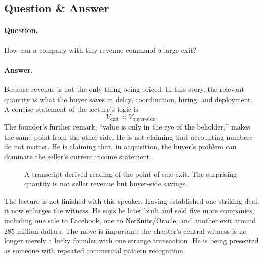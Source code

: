 \subsection{Question \& Answer}

\paragraph{Question.} How can a company with tiny revenue command a large exit?

\paragraph{Answer.} Because revenue is not the only thing being priced. In this story, the relevant quantity is what the buyer saves in delay, coordination, hiring, and deployment. A concise statement of the lecture's logic is
\begin{equation}
V_{\text{exit}} \approx V_{\text{buyer-side}}.
\end{equation}
The founder's further remark, ``value is only in the eye of the beholder,'' makes the same point from the other side. He is not claiming that accounting numbers do not matter. He is claiming that, in acquisition, the buyer's problem can dominate the seller's current income statement.

\begin{figure}[h]
\centering
{}
\caption{A transcript-derived reading of the point-of-sale exit. The surprising quantity is not seller revenue but buyer-side savings.}
\end{figure}

The lecture is not finished with this speaker. Having established one striking deal, it now enlarges the witness. He says he later built and sold five more companies, including one sale to Facebook, one to NetSuite/Oracle, and another exit around \(285\) million dollars. The move is important: the chapter's central witness is no longer merely a lucky founder with one strange transaction. He is being presented as someone with repeated commercial pattern recognition.

